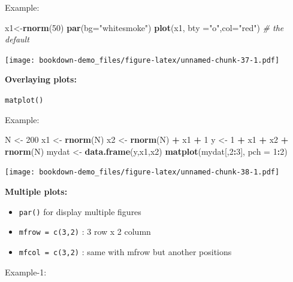 \documentclass[]{book}
\newenvironment{Shaded}{\begin{snugshade}}{\end{snugshade}}
\newcommand{\KeywordTok}[1]{\textcolor[rgb]{0.13,0.29,0.53}{\textbf{#1}}}
\newcommand{\DataTypeTok}[1]{\textcolor[rgb]{0.13,0.29,0.53}{#1}}
\newcommand{\DecValTok}[1]{\textcolor[rgb]{0.00,0.00,0.81}{#1}}
\newcommand{\StringTok}[1]{\textcolor[rgb]{0.31,0.60,0.02}{#1}}
\newcommand{\CommentTok}[1]{\textcolor[rgb]{0.56,0.35,0.01}{\textit{#1}}}
\newcommand{\OperatorTok}[1]{\textcolor[rgb]{0.81,0.36,0.00}{\textbf{#1}}}
\newcommand{\NormalTok}[1]{#1}
\begin{document}
Example:

\begin{Shaded}
\begin{Highlighting}[]
\NormalTok{x1<-}\KeywordTok{rnorm}\NormalTok{(}\DecValTok{50}\NormalTok{)}
\KeywordTok{par}\NormalTok{(}\DataTypeTok{bg=}\StringTok{"whitesmoke"}\NormalTok{)}
\KeywordTok{plot}\NormalTok{(x1, }\DataTypeTok{bty =}\StringTok{"o"}\NormalTok{,}\DataTypeTok{col=}\StringTok{"red"}\NormalTok{) }\CommentTok{# the default}
\end{Highlighting}
\end{Shaded}

\texttt{[image: bookdown-demo\_files/figure-latex/unnamed-chunk-37-1.pdf]}

\textbf{Overlaying plots: }

\texttt{matplot()}

Example:

\begin{Shaded}
\begin{Highlighting}[]
\NormalTok{N <-}\StringTok{ }\DecValTok{200}
\NormalTok{x1 <-}\StringTok{ }\KeywordTok{rnorm}\NormalTok{(N)}
\NormalTok{x2 <-}\StringTok{ }\KeywordTok{rnorm}\NormalTok{(N) }\OperatorTok{+}\StringTok{ }\NormalTok{x1 }\OperatorTok{+}\StringTok{ }\DecValTok{1}
\NormalTok{y <-}\StringTok{ }\DecValTok{1} \OperatorTok{+}\StringTok{ }\NormalTok{x1 }\OperatorTok{+}\StringTok{ }\NormalTok{x2 }\OperatorTok{+}\StringTok{ }\KeywordTok{rnorm}\NormalTok{(N)}
\NormalTok{mydat <-}\StringTok{ }\KeywordTok{data.frame}\NormalTok{(y,x1,x2)}
\KeywordTok{matplot}\NormalTok{(mydat[,}\DecValTok{2}\OperatorTok{:}\DecValTok{3}\NormalTok{], }\DataTypeTok{pch =} \DecValTok{1}\OperatorTok{:}\DecValTok{2}\NormalTok{)}
\end{Highlighting}
\end{Shaded}

\texttt{[image: bookdown-demo\_files/figure-latex/unnamed-chunk-38-1.pdf]}

\textbf{Multiple plots: }

\begin{itemize}
\item
  \texttt{par()} for display multiple figures
\item
  \texttt{mfrow\ =\ c(3,2)} : 3 row x 2 column
\item
  \texttt{mfcol\ =\ c(3,2)} : same with mfrow but another positions
\end{itemize}

Example-1:
\end{document}
